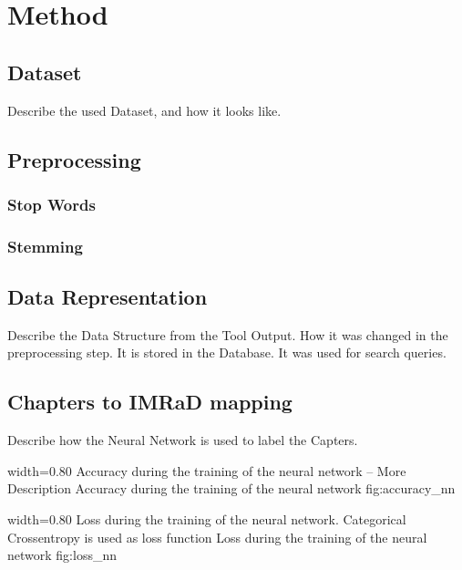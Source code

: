 \chapter{Method}
\label{cha:method}

\section{Dataset}
\label{sec:dataset}

Describe the used Dataset, and how it looks like.

\section{Preprocessing}
\label{sec:preprocessing}

\subsection{Stop Words}
\label{subsec:stop-words}

\subsection{Stemming}
\label{subsec:stemming}

\section{Data Representation}
\label{sec:data-representation}

Describe the Data Structure from the Tool Output. How it was changed in the preprocessing step. It is stored in the Database. It was used for search queries.  

\section{Chapters to IMRaD mapping}
\label{sec:chapters-to-imrad-mapping}

Describe how the Neural Network is used to label the Capters.

      {width=0.80\textwidth}
      {Accuracy during the training of the neural network -- More Description}
      {Accuracy during the training of the neural network}
      {fig:accuracy_nn}

      {width=0.80\textwidth}
      {Loss during the training of the neural network. Categorical Crossentropy is used as loss function}
      {Loss during the training of the neural network}
      {fig:loss_nn}
      
